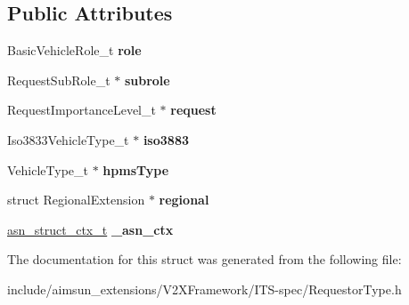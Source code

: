 \subsection*{Public Attributes}
\begin{DoxyCompactItemize}
\item 
Basic\+Vehicle\+Role\+\_\+t {\bfseries role}\hypertarget{structRequestorType_a6087069098a3591c27f8b52081032f80}{}\label{structRequestorType_a6087069098a3591c27f8b52081032f80}

\item 
Request\+Sub\+Role\+\_\+t $\ast$ {\bfseries subrole}\hypertarget{structRequestorType_a784a4a23fa67c71c51b9abe0b7b3363f}{}\label{structRequestorType_a784a4a23fa67c71c51b9abe0b7b3363f}

\item 
Request\+Importance\+Level\+\_\+t $\ast$ {\bfseries request}\hypertarget{structRequestorType_a1982ae5fc8a1cb9e086091d96ad9d612}{}\label{structRequestorType_a1982ae5fc8a1cb9e086091d96ad9d612}

\item 
Iso3833\+Vehicle\+Type\+\_\+t $\ast$ {\bfseries iso3883}\hypertarget{structRequestorType_ac62d0a56ce4d60e982de6166a7450cf3}{}\label{structRequestorType_ac62d0a56ce4d60e982de6166a7450cf3}

\item 
Vehicle\+Type\+\_\+t $\ast$ {\bfseries hpms\+Type}\hypertarget{structRequestorType_a4d4f8ab3e8940898971595eae0d031c3}{}\label{structRequestorType_a4d4f8ab3e8940898971595eae0d031c3}

\item 
struct Regional\+Extension $\ast$ {\bfseries regional}\hypertarget{structRequestorType_a647569d6632b33e09bc46997db36bcaf}{}\label{structRequestorType_a647569d6632b33e09bc46997db36bcaf}

\item 
\hyperlink{structasn__struct__ctx__s}{asn\+\_\+struct\+\_\+ctx\+\_\+t} {\bfseries \+\_\+asn\+\_\+ctx}\hypertarget{structRequestorType_a0566f21416a412b35cb8bae176bf7f0c}{}\label{structRequestorType_a0566f21416a412b35cb8bae176bf7f0c}

\end{DoxyCompactItemize}


The documentation for this struct was generated from the following file\+:\begin{DoxyCompactItemize}
\item 
include/aimsun\+\_\+extensions/\+V2\+X\+Framework/\+I\+T\+S-\/spec/Requestor\+Type.\+h\end{DoxyCompactItemize}
